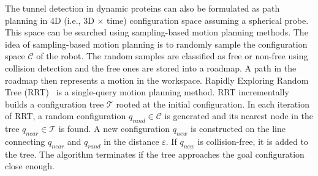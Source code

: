 \documentclass{svmult}
\def\qrand{q_{rand}}
\def\qnear{q_{near}}
\def\qnew{q_{new}}
\def\C{\mathcal{C}}
\def\T{\mathcal{T}}
\begin{document}
The tunnel detection in dynamic proteins can also be formulated as path planning in 4D (i.e., 3D $\times$ time) 
configuration space assuming a spherical probe.
This space can be searched using sampling-based motion planning methods.
The idea of sampling-based motion planning is to randomly sample the configuration space $\C$ of the robot. %
The random samples are classified as free or non-free using collision detection and  the free ones are stored into a roadmap.
A path in the roadmap then represents a motion in the workspace.
Rapidly Exploring Random Tree (RRT)~\cite{lavalleRRT} is a single-query motion planning method.
RRT incrementally builds a configuration tree $\T$ rooted at the initial configuration.
In each iteration of RRT, a random configuration $\qrand \in \C$ is generated and its nearest node in the tree $\qnear \in \T$ is found.
A new configuration $\qnew$ is constructed on the line connecting $\qnear$ and $\qrand$ in the distance $\varepsilon$.
If $\qnew$ is collision-free, it is added to the tree.
The algorithm terminates if the tree approaches the goal configuration close enough.
\end{document}

